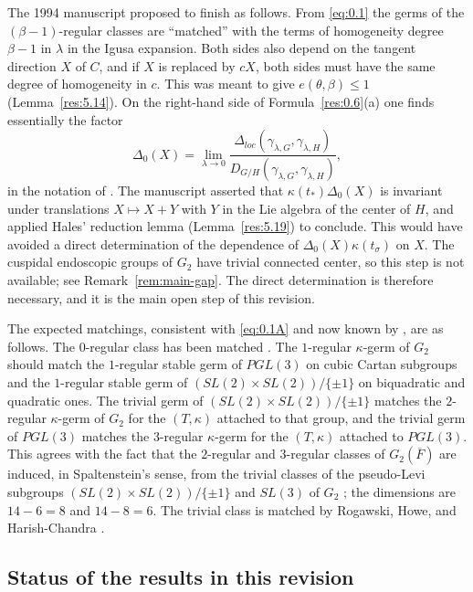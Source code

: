 \documentclass[12pt,letterpaper]{amsart}
\theoremstyle{plain}
\theoremstyle{definition}
\theoremstyle{remark}
\theoremstyle{definition}
\begin{document}
The 1994 manuscript proposed to finish as follows. From \eqref{eq:0.1} the
germs of the $(\beta -1)$-regular classes are ``matched'' with the terms of
homogeneity degree $\beta -1$ in $\lambda$ in the Igusa expansion. Both sides
also depend on the tangent direction $X$ of $C$, and if $X$ is replaced by
$cX$, both sides must have the same degree of homogeneity in $c$. This was
meant to give $e(\theta,\beta)\leq 1$ (Lemma~\ref{res:5.14}). On the
right-hand side of Formula~\ref{res:0.6}(a) one finds essentially the factor
\[
\Delta_{0}(X)=\lim_{\lambda\rightarrow 0}
\frac{\Delta_{loc}(\gamma_{\lambda,G},\gamma_{\lambda,H})}{
D_{G/H}(\gamma_{\lambda,G},\gamma_{\lambda,H})},
\]
in the notation of \cite[\S 2]{Ha92b}. The manuscript asserted that
$\kappa(t_*)\Delta_0(X)$ is invariant under translations $X\mapsto X+Y$ with
$Y$ in the Lie algebra of the center of $H$, and applied Hales' reduction
lemma (Lemma~\ref{res:5.19}) to conclude. This would have avoided a direct
determination of the dependence of $\Delta_{0}(X)\kappa(t_\sigma)$ on $X$.
The cuspidal endoscopic groups of $G_2$ have trivial connected center, so this
step is not available; see Remark~\ref{rem:main-gap}. The direct
determination is therefore necessary, and it is the main open step of this
revision.

The expected matchings, consistent with \eqref{eq:0.1A} and now known by
\cite{GH16}, are as follows. The $0$-regular class has been matched
\cite{She89}. The $1$-regular $\kappa$-germ of $G_2$ should match the
$1$-regular stable germ of $PGL(3)$ on cubic Cartan subgroups and the
$1$-regular stable germ of $(SL(2)\times SL(2))/\{\pm 1\}$ on biquadratic and
quadratic ones. The trivial germ of $(SL(2)\times SL(2))/\{\pm 1\}$ matches
the $2$-regular $\kappa$-germ of $G_2$ for the $(T,\kappa)$ attached to that
group, and the trivial germ of $PGL(3)$ matches the $3$-regular $\kappa$-germ
for the $(T,\kappa)$ attached to $PGL(3)$. This agrees with the fact that the
$2$-regular and $3$-regular classes of $G_2(\overline{F})$ are induced, in
Spaltenstein's sense, from the trivial classes of the pseudo-Levi subgroups
$(SL(2)\times SL(2))/\{\pm1\}$ and $SL(3)$ of $G_2$
\cite[ch.~III, table on page 221]{Spa82}; the dimensions are
$14-6=8$ and $14-8=6$. The trivial class is matched by
Rogawski, Howe, and Harish-Chandra \cite{Ro80}.

\subsection*{Status of the results in this revision}
\end{document}

